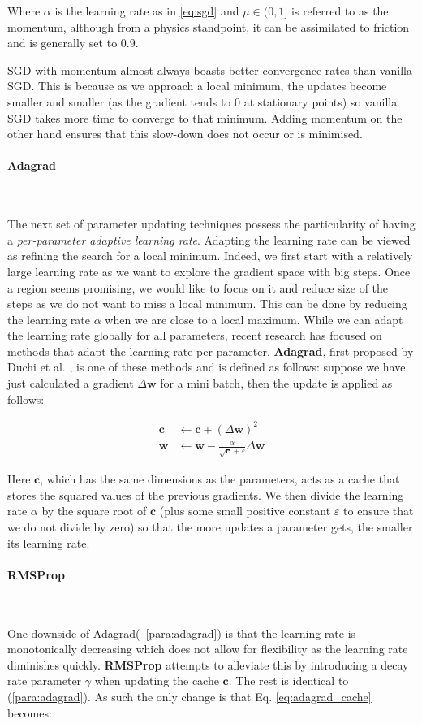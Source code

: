 \documentclass[12pt,twoside]{article}
\newcommand{\para}[1]{\paragraph{#1}\mbox{}\\}
\begin{document}
Where $\alpha$ is the learning rate as in \eqref{eq:sgd} and $\mu \in (0,1]$ is referred
to as the momentum, although from a physics standpoint, it can be assimilated
to friction and is generally set to $0.9$.

SGD with momentum almost always boasts better convergence rates than vanilla
SGD. This is because as we approach a local minimum, the updates become smaller
and smaller (as the gradient tends to 0 at stationary points) so vanilla SGD
takes more time to converge to that minimum. Adding momentum on the other hand
ensures that this slow-down does not occur or is minimised.
\para{Adagrad}\label{para:adagrad}

The next set of parameter updating techniques possess the particularity of
having a \textit{per-parameter adaptive learning rate}. Adapting the learning rate can
be viewed as refining the search for a local minimum. Indeed, we first start
with a relatively large learning rate as we want to explore the gradient space
with big steps. Once a region seems promising, we would like to focus on it and
reduce size of the steps as we do not want to miss a local minimum. This can be
done by reducing the learning rate $\alpha$ when we are close to a local
maximum. While we can adapt the learning rate globally for all parameters,
recent research has focused on methods that adapt the learning rate per-parameter.
\textbf{Adagrad}, first proposed by Duchi et al. \cite{RefWorks:26}, is one of these
methods and is defined as follows: suppose we have just calculated a gradient
$\Delta\bm{w}$ for a mini batch, then the update is applied as follows:

\begin{align}
  \bm{c} &\leftarrow \bm{c} + \left( \Delta\bm{w} \right)^2
  \label{eq:adagrad_cache}\\
  \bm{w} &\leftarrow \bm{w} - \frac{\alpha}{\sqrt{\bm{c}} + \varepsilon}
  \Delta\bm{w}
  \label{eq:adagrad}
\end{align}

Here $\bm{c}$, which has the same dimensions as the parameters, acts as a cache
that stores the squared values of the previous gradients. We then divide the
learning rate $\alpha$ by the square root of $\bm{c}$ (plus some small positive
constant $\varepsilon$ to ensure that we do not divide by zero) so that the
more updates a parameter gets, the smaller its learning rate.

\para{RMSProp}\label{para:rmsprop}

One downside of Adagrad(~\ref{para:adagrad}) is that the learning rate is
monotonically decreasing which does not allow for flexibility as the learning
rate diminishes quickly.
\textbf{RMSProp} attempts to alleviate this by introducing a decay rate
parameter $\gamma$ when updating the cache $\bm{c}$. The rest is identical to
(\ref{para:adagrad}). As such the only change is that Eq.
\eqref{eq:adagrad_cache} becomes:
\end{document}
